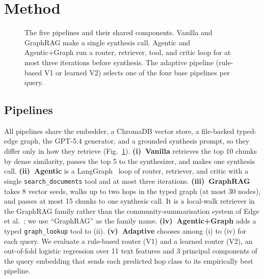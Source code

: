 \section{Method}
\label{sec:method}

\begin{figure}[t!]
  \centering
  \resizebox{0.36\textwidth}{!}{}%
  \caption{The five pipelines and their shared components. Vanilla and
    GraphRAG make a single synthesis call. Agentic and Agentic+Graph run
    a router, retriever, tool, and critic loop for at most three
    iterations before synthesis. The adaptive pipeline (rule-based V1 or
    learned V2) selects one of the four base pipelines per query.}
  \label{fig:architecture}
\end{figure}

\subsection{Pipelines}
\label{sec:pipelines}
All pipelines share the embedder, a ChromaDB vector store, a file-backed
typed-edge graph, the GPT-5.4 generator, and a grounded synthesis
prompt, so they differ only in how they retrieve
(Fig.~\ref{fig:architecture}).
\textbf{(i)~Vanilla} retrieves the top 10 chunks by dense similarity,
passes the top 5 to the synthesizer, and makes one synthesis call.
\textbf{(ii)~Agentic} is a LangGraph~\cite{langgraph_software} loop of
router, retriever, and critic with a single \texttt{search\_documents}
tool and at most three iterations.
\textbf{(iii)~GraphRAG} takes 8 vector seeds, walks up to two hops in
the typed graph (at most 30 nodes), and passes at most 15 chunks to one
synthesis call. It is a local-walk retriever in the GraphRAG family
rather than the community-summarisation system of Edge
et al.~\cite{graphrag2024}; we use ``GraphRAG'' as the family name.
\textbf{(iv)~Agentic+Graph} adds a typed \texttt{graph\_lookup} tool to
(ii). \textbf{(v)~Adaptive} chooses among (i) to (iv) for each query. We
evaluate a rule-based router (V1) and a learned router (V2), an
out-of-fold logistic regression over 11 text features and 3
principal components of the query embedding that sends each predicted
hop class to its empirically best pipeline.


